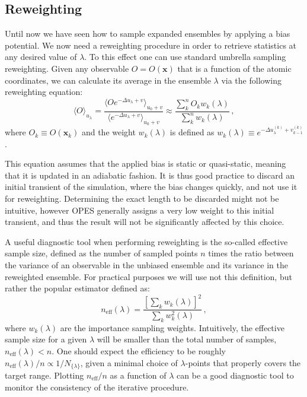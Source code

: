 \documentclass[aps,prx,reprint,superscriptaddress]{revtex4-1} %
\begin{document}
\subsection{Reweighting\label{S:reweighting}}
Until now we have seen how to sample expanded ensembles by applying a bias potential.
We now need a reweighting procedure in order to retrieve statistics at any desired value of $\lambda$.
To this effect one can use standard umbrella sampling reweighting\cite{Torrie1977}.
Given any observable $O=O(\mathbf{x})$ that is a function of the atomic coordinates, we can calculate its average in the ensemble $\lambda$ via the following reweighting equation:
\begin{equation}\label{E:reweight}
    \langle O \rangle_{u_\lambda}=\frac{\langle O e^{-\Delta u_\lambda+v}\rangle_{u_0+v}}{\langle e^{-\Delta u_\lambda+v}\rangle_{u_0+v}}
    \approx \frac{\sum_k^n O_k w_k(\lambda)}{\sum_k^n w_k(\lambda)}\, ,
\end{equation}
where $O_k\equiv O(\mathbf{x}_k)$ and the weight $w_k(\lambda)$ is defined as $w_k(\lambda)\equiv e^{-\Delta u_\lambda^{(k)}+v_{k-1}^{(k)}}$.

This equation assumes that the applied bias is static or quasi-static, meaning that it is updated in an adiabatic fashion.
It is thus good practice to discard an initial transient of the simulation, where the bias changes quickly, and not use it for reweighting.
Determining the exact length to be discarded might not be intuitive, however OPES generally assigns a very low weight to this initial transient, and thus the result will not be significantly affected by this choice\cite{Invernizzi2020}.

A useful diagnostic tool when performing reweighting is the so-called effective sample size, defined as the number of sampled points $n$ times the ratio between the variance of an observable in the unbiased ensemble and its variance in the reweighted ensemble\cite{Kong1994}.
For practical purposes we will use not this definition, but rather the popular estimator\cite{Kish1965} defined as:
\begin{equation}\label{E:neff}
    n_{\text{eff}}(\lambda)=\frac{\left[\sum_k w_k(\lambda)\right]^2}{\sum_k w_k^2(\lambda)}\, ,
\end{equation}
where $w_k(\lambda)$ are the importance sampling weights.
Intuitively, the effective sample size for a given $\lambda$ will be smaller than the total number of samples, $n_{\text{eff}}(\lambda)<n$.
One should expect the efficiency to be roughly $n_{\text{eff}}(\lambda)/n\propto 1/N_{\{\lambda\}}$, given a minimal choice of $\lambda$-points that properly covers the target range.
Plotting $n_{\text{eff}}/n$ as a function of $\lambda$ can be a good diagnostic tool to monitor the consistency of the iterative procedure.
\end{document}
